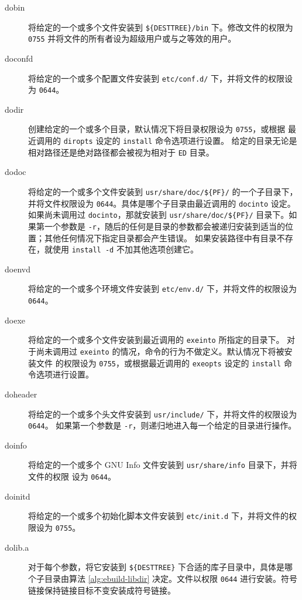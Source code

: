 \begin{description}
\item[dobin] 将给定的一个或多个文件安装到 \texttt{\$\{DESTTREE\}/bin} 下。修改文件的权限为
    \texttt{0755} 并将文件的所有者设为超级用户或与之等效的用户。

\item[doconfd] 将给定的一个或多个配置文件安装到 \texttt{etc/conf.d/} 下，并将文件的权限设为 \texttt{0644}。

\item[dodir] 创建给定的一个或多个目录，默认情况下将目录权限设为 \texttt{0755}，或根据
    最近调用的 \texttt{diropts} 设定的 \texttt{install} 命令选项进行设置。
    给定的目录无论是相对路径还是绝对路径都会被视为相对于 \texttt{ED} 目录。

\item[dodoc] 将给定的一个或多个文件安装到 \texttt{usr/share/doc/\$\{PF\}/}
    的一个子目录下，并将文件权限设为 \texttt{0644}。具体是哪个子目录由最近调用的 \texttt{docinto} 设定。
    如果尚未调用过 \texttt{docinto}，那就安装到 \texttt{usr/share/doc/\$\{PF\}/} 目录下。如果第一个参数是
    \texttt{-r}，随后的任何是目录的参数都会被递归安装到适当的位置；其他任何情况下指定目录都会产生错误。
    如果安装路径中有目录不存在，就使用 \texttt{install -d} 不加其他选项创建它。

\item[doenvd] 将给定的一个或多个环境文件安装到 \texttt{etc/env.d/} 下，并将文件的权限设为 \texttt{0644}。

\item[doexe] 将给定的一个或多个文件安装到最近调用的 \texttt{exeinto} 所指定的目录下。
    对于尚未调用过 \texttt{exeinto} 的情况，命令的行为不做定义。默认情况下将被安装文件
    的权限设为 \texttt{0755}，或根据最近调用的 \texttt{exeopts} 设定的 \texttt{install} 命令选项进行设置。

\item[doheader] 将给定的一个或多个头文件安装到 \texttt{usr/include/} 下，并将文件的权限设为 \texttt{0644}。
    如果第一个参数是 \texttt{-r}，则递归地进入每一个给定的目录进行操作。

\item[doinfo] 将给定的一个或多个 GNU Info 文件安装到 \texttt{usr/share/info} 目录下，并将文件的权限
    设为 \texttt{0644}。

\item[doinitd] 将给定的一个或多个初始化脚本文件安装到 \texttt{etc/init.d} 下，并将文件的权限设为 \texttt{0755}。

\item[dolib.a] 对于每个参数，将它安装到 \texttt{\$\{DESTTREE\}} 下合适的库子目录中，具体是哪个子目录由算法
    \ref{alg:ebuild-libdir} 决定。文件以权限 \texttt{0644} 进行安装。符号链接保持链接目标不变安装成符号链接。


\end{description}
